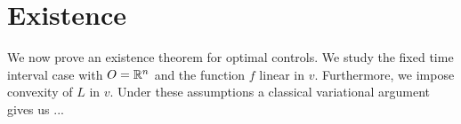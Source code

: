 \section{Existence}

We now prove an existence theorem for optimal controls.
We study the fixed time interval case with $O=\mathbb{R}^n$ and the function $f$ linear in $v$.
Furthermore, we impose convexity of $L$ in $v$. Under these assumptions a classical variational
argument gives us ...
\begin{theorem}
    
\end{theorem}